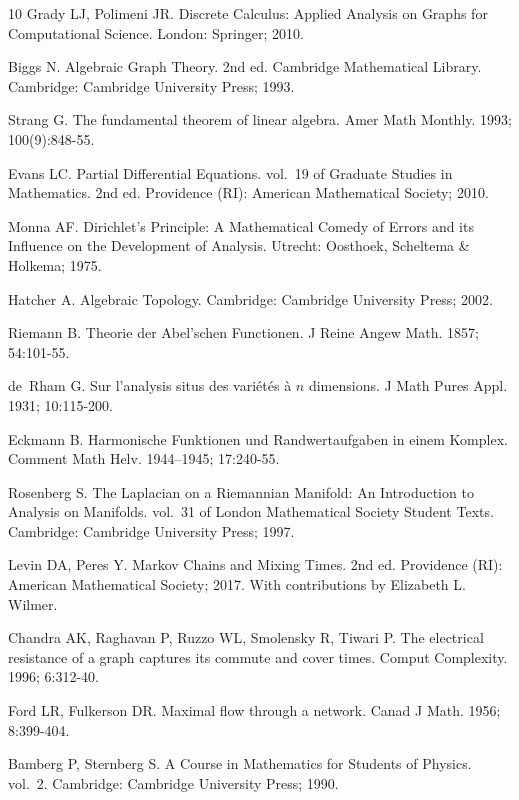 \documentclass[11pt,a4paper]{article}
\theoremstyle{plain}
\theoremstyle{definition}
\begin{document}
\begin{thebibliography}{10}
Grady LJ, Polimeni JR.
\newblock Discrete Calculus: Applied Analysis on Graphs for Computational
  Science.
\newblock London: Springer; 2010.

Biggs N.
\newblock Algebraic Graph Theory.
\newblock 2nd ed. Cambridge Mathematical Library. Cambridge: Cambridge
  University Press; 1993.

Strang G.
\newblock The fundamental theorem of linear algebra.
\newblock Amer Math Monthly. 1993; 100(9):848-55.

Evans LC.
\newblock Partial Differential Equations. vol.~19 of Graduate Studies in
  Mathematics.
\newblock 2nd ed. Providence (RI): American Mathematical Society; 2010.

Monna AF.
\newblock Dirichlet's Principle: A Mathematical Comedy of Errors and its
  Influence on the Development of Analysis.
\newblock Utrecht: Oosthoek, Scheltema \& Holkema; 1975.

Hatcher A.
\newblock Algebraic Topology.
\newblock Cambridge: Cambridge University Press; 2002.

Riemann B.
\newblock Theorie der {A}bel'schen {F}unctionen.
\newblock J Reine Angew Math. 1857; 54:101-55.

de~Rham G.
\newblock Sur l'analysis situs des vari{\'e}t{\'e}s {\`a} $n$ dimensions.
\newblock J Math Pures Appl. 1931; 10:115-200.

Eckmann B.
\newblock Harmonische {F}unktionen und {R}andwertaufgaben in einem {K}omplex.
\newblock Comment Math Helv. 1944--1945; 17:240-55.

Rosenberg S.
\newblock The Laplacian on a Riemannian Manifold: An Introduction to Analysis
  on Manifolds. vol.~31 of London Mathematical Society Student Texts.
\newblock Cambridge: Cambridge University Press; 1997.

Levin DA, Peres Y.
\newblock Markov Chains and Mixing Times.
\newblock 2nd ed. Providence (RI): American Mathematical Society; 2017.
\newblock With contributions by Elizabeth L. Wilmer.

Chandra AK, Raghavan P, Ruzzo WL, Smolensky R, Tiwari P.
\newblock The electrical resistance of a graph captures its commute and cover
  times.
\newblock Comput Complexity. 1996; 6:312-40.

Ford LR, Fulkerson DR.
\newblock Maximal flow through a network.
\newblock Canad J Math. 1956; 8:399-404.

Bamberg P, Sternberg S.
\newblock A Course in Mathematics for Students of Physics. vol.~2.
\newblock Cambridge: Cambridge University Press; 1990.


\end{thebibliography}
\end{document}
